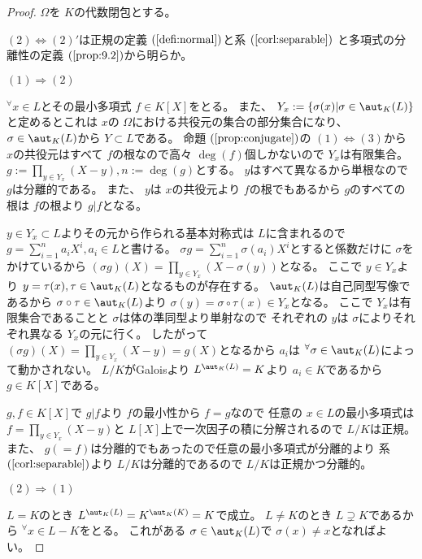 \documentclass[../master_galois_theory]{subfiles}
\begin{document}
\begin{proof}
  $\Omega$を $K$の代数閉包とする。

  $(2) \Leftrightarrow (2)'$は正規の定義 $(\mathrm{\ref{defi:normal}})$と系 $(\mathrm{\ref{corl:separable}})$
  と多項式の分離性の定義 $(\mathrm{\ref{prop:9.2}})$から明らか。

  $(1) \Rightarrow (2)$

  ${}^\forall x \in L$とその最小多項式 $f \in K[X]$をとる。
  また、 $Y_x := \{ \sigma(x) | \sigma \in \aut_K(L) \}$
  と定めるとこれは $x$の $\Omega$における共役元の集合の部分集合になり、
  $\sigma \in \aut_K(L)$から $Y \subset L$である。
  命題 $(\mathrm{\ref{prop:conjugate}})$の $(1) \Leftrightarrow (3)$から
  $x$の共役元はすべて $f$の根なので高々 $\deg(f)$個しかないので $Y_x$は有限集合。
  $g := \prod_{y \in Y_x}(X - y) , n := \deg(g)$とする。
  $y$はすべて異なるから単根なので $g$は分離的である。
  また、 $y$は $x$の共役元より $f$の根でもあるから $g$のすべての根は $f$の根より
  $g|f$となる。

  $y \in Y_x \subset L$よりその元から作られる基本対称式は $L$に含まれるので
  $g = \sum_{i=1}^n a_i X^i , a_i \in L$と書ける。
  $\sigma g = \sum_{i=1}^n \sigma(a_i) X^i$とすると係数だけに $\sigma$をかけているから $(\sigma g)(X) = \prod_{y \in Y_x}(X - \sigma(y))$となる。
  ここで $y \in Y_x$より $y = \tau(x) , \tau \in \aut_K(L)$となるものが存在する。
  $\aut_K(L)$は自己同型写像であるから $\sigma \circ \tau \in \aut_K(L)$より $\sigma(y) = \sigma \circ \tau(x) \in Y_x$となる。
  ここで $Y_x$は有限集合であることと $\sigma$は体の準同型より単射なので
  それぞれの $y$は $\sigma$によりそれぞれ異なる $Y_x$の元に行く。
  したがって $(\sigma g)(X) = \prod_{y \in Y_x}(X - y) = g(X)$となるから
  $a_i$は ${}^\forall \sigma \in \aut_K(L)$によって動かされない。
  $L/K$が\rm{Galois}より $L^{\aut_K(L)} = K$より $a_i \in K$であるから
  $g \in K[X]$である。

  $g , f \in K[X]$で $g|f$より $f$の最小性から $f = g$なので
  任意の $x \in L$の最小多項式は
  $f = \prod_{y \in Y_x}(X - y)$と $L[X]$上で一次因子の積に分解されるので
  $L/K$は正規。
  また、 $g (= f)$は分離的でもあったので任意の最小多項式が分離的より
  系 $(\mathrm{\ref{corl:separable}})$より $L/K$は分離的であるので
  $L/K$は正規かつ分離的。

  $(2) \Rightarrow (1)$

  $L = K$のとき $L^{\aut_K(L)} = K^{\aut_K(K)} = K$で成立。
  $L \neq K$のとき $L \supsetneq K$であるから ${}^\forall x \in L - K$をとる。
  これがある $\sigma \in \aut_K(L)$で $\sigma(x) \neq x$となればよい。


\end{proof}
\end{document}
